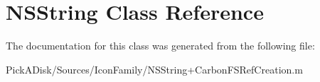 \hypertarget{class_n_s_string}{
\section{NSString Class Reference}
\label{class_n_s_string}
}


The documentation for this class was generated from the following file:\begin{DoxyCompactItemize}
\item 
PickADisk/Sources/IconFamily/NSString+CarbonFSRefCreation.m\end{DoxyCompactItemize}
